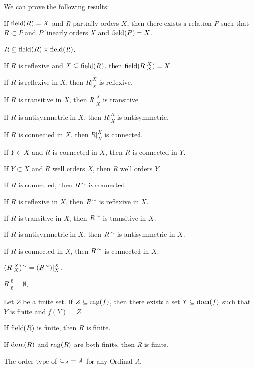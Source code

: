 \documentclass{article}
\begin{document}
We can prove the following results:
\begin{thm}
\item\label{orders1:69} If $\operatorname{field}(R)=X$ and $R$ partially orders $X$,
  then there exists a relation $P$ such that $R\subset P$ and $P$
  linearly orders $X$ and $\operatorname{field}(P)=X$.
\item\label{orders1:70} $R\subseteq\operatorname{field}(R)\times\operatorname{field}(R)$.
\item\label{orders1:71} If $R$ is reflexive and $X\subseteq\operatorname{field}(R)$,
  then $\operatorname{field}(R|^{X}_{X})=X$
\item\label{orders1:72} If $R$ is reflexive in $X$, then $R|^{X}_{X}$ is reflexive.
\item\label{orders1:73} If $R$ is transitive in $X$, then $R|^{X}_{X}$ is transitive.
\item\label{orders1:74} If $R$ is antisymmetric in $X$, then $R|^{X}_{X}$ is antisymmetric.
\item\label{orders1:75} If $R$ is connected in $X$, then $R|^{X}_{X}$ is connected.
\item\label{orders1:76} If $Y\subset X$ and $R$ is connected in $X$,
  then $R$ is connected in $Y$.
\item\label{orders1:77} If $Y\subset X$ and $R$ well orders $X$,
  then $R$ well orders $Y$.
\item\label{orders1:78} If $R$ is connected, then $R^{\,\sim}$ is connected.
\item\label{orders1:79} If $R$ is reflexive in $X$, then $R^{\,\sim}$
  is reflexive in $X$.
\item\label{orders1:80} If $R$ is transitive in $X$, then $R^{\,\sim}$
  is transitive in $X$.
\item\label{orders1:81} If $R$ is antisymmetric in $X$, then
  $R^{\,\sim}$ is antisymmetric in $X$.
\item\label{orders1:82} If $R$ is connected in $X$, then $R^{\,\sim}$
  is connected in $X$.
\item\label{orders1:83} $(R|^{X}_{X})^{\,\sim}=(R^{\,\sim})|^{X}_{X}$.
\item\label{orders1:84} $R|^{\emptyset}_{\emptyset}=\emptyset$.
\item\label{orders1:85} Let $Z$ be a finite set. If $Z\subseteq\operatorname{rng}(f)$,
  then there exists a set $Y\subseteq\operatorname{dom}(f)$ such that $Y$ is finite and $f(Y)=Z$.
\item\label{orders1:86} If $\operatorname{field}(R)$ is finite, then $R$ is finite.
\item\label{orders1:87} If $\operatorname{dom}(R)$ and $\operatorname{rng}(R)$ are both finite, then
  $R$ is finite.
\item\label{orders1:88} The order type of $\mathord{\subseteq_{A}}=A$ for any
  Ordinal $A$.
\end{thm}
\end{document}

